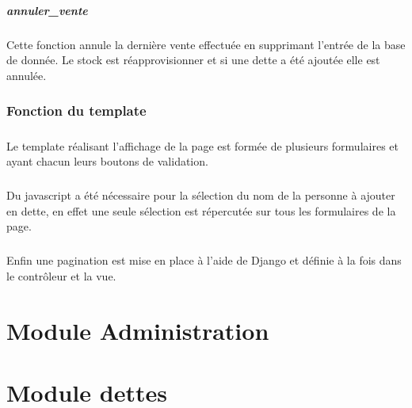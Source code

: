 \documentclass[twoside,UTF8]{EPURapport}
\begin{document}
            \paragraph{annuler\_vente}Cette fonction annule la dernière vente effectuée en supprimant l'entrée de la base de donnée. Le stock est réapprovisionner et si une dette a été ajoutée elle est annulée.

        \subsection{Fonction du template}

            \paragraph{}Le template réalisant l'affichage de la page est formée de plusieurs formulaires et ayant chacun leurs boutons de validation.

            \paragraph{}Du javascript a été nécessaire pour la sélection du nom de la personne à ajouter en dette, en effet une seule sélection est répercutée sur tous les formulaires de la page.

            \paragraph{}Enfin une pagination est mise en place à l'aide de Django et définie à la fois dans le contrôleur et la vue.%

\chapter{Module Administration}

\chapter{Module dettes}
\end{document}
